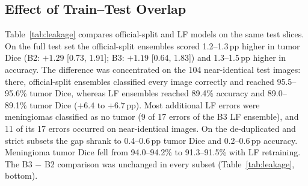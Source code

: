 \documentclass[journal]{IEEEtran}
\begin{document}
\subsection{Effect of Train--Test Overlap}
Table~\ref{tab:leakage} compares official-split and LF models on the same test slices. On the full test set the official-split ensembles scored 1.2--1.3\,pp higher in tumor Dice (B2: $+1.29$ [0.73, 1.91]; B3: $+1.19$ [0.64, 1.83]) and 1.3--1.5\,pp higher in accuracy. The difference was concentrated on the 104 near-identical test images: there, official-split ensembles classified every image correctly and reached 95.5--95.6\% tumor Dice, whereas LF ensembles reached 89.4\% accuracy and 89.0--89.1\% tumor Dice ($+6.4$ to $+6.7$\,pp). Most additional LF errors were meningiomas classified as no tumor (9 of 17 errors of the B3 LF ensemble), and 11 of its 17 errors occurred on near-identical images. On the de-duplicated and strict subsets the gap shrank to 0.4--0.6\,pp tumor Dice and 0.2--0.6\,pp accuracy. Meningioma tumor Dice fell from 94.0--94.2\% to 91.3--91.5\% with LF retraining. The B3 $-$ B2 comparison was unchanged in every subset (Table~\ref{tab:leakage}, bottom).
\end{document}
